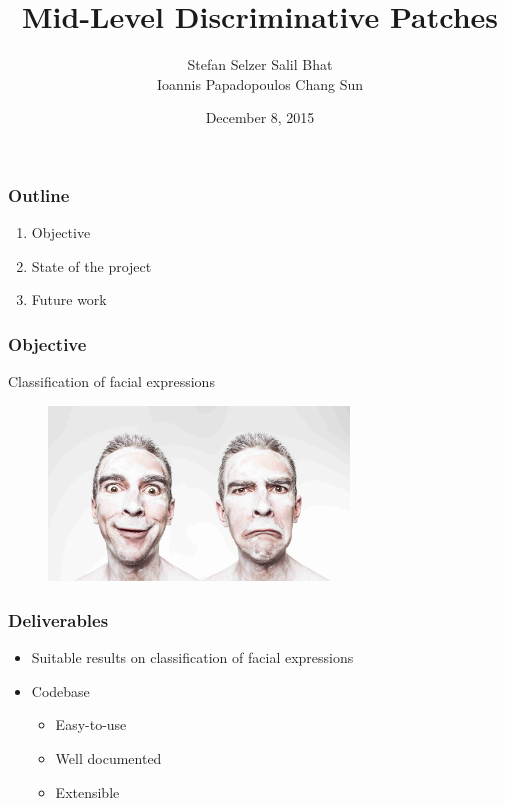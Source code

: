 \documentclass[serif,14pt]{beamer}
\author[Group 4]{Stefan Selzer \quad Salil Bhat\\Ioannis Papadopoulos \quad Chang Sun}
\title[Mid-Level Discriminative Patches\hspace{2em}\insertframenumber/\inserttotalframenumber]{Mid-Level Discriminative Patches}
\date{December 8, 2015}
\institute{Maastricht University}
\begin{document}
\maketitle


\begin{frame}
  \frametitle{Outline}

  \begin{enumerate}
      \item Objective
      \item State of the project
      \item Future work
  \end{enumerate}
  
\end{frame}

\begin{frame}
  \frametitle{Objective}
\centerline{  Classification of facial expressions}
  \begin{figure}[t]
    \centering
    \includegraphics[width=8cm]{introduction_image.jpg}
  \end{figure}
  
\end{frame}

\begin{frame}
  \frametitle{Deliverables}

  \begin{itemize}
      \item Suitable results on classification of facial expressions
      \item Codebase
        \begin{itemize}
          \item Easy-to-use
          \item Well documented
          \item Extensible
      	\end{itemize}
  \end{itemize}
\end{frame}
\end{document}
